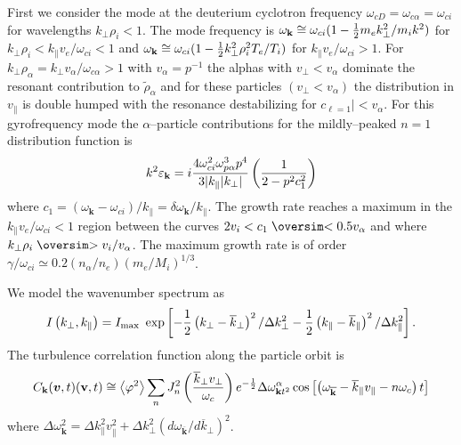 \documentclass[a4paper,openany,12pt]{report}
\def\nms{\mathsurround=0pt}
\def\gtsim{\mathrel{\mathpalette\oversim>}} %
\def\ltsim{\mathrel{\mathpalette\oversim<}} %
\def\oversim#1#2{\lower 2pt\vbox{\baselineskip 0pt \lineskip 1pt
    \ialign{$\nms#1\hfil##\hfil$\crcr#2\crcr\sim\crcr}}}
\begin{document}
First we consider the mode at the deuterium cyclotron frequency $\omega_{cD}=\omega_{c\alpha}=\omega_{ci}$ for wavelengths $k_\perp\rho_i < 1$. The mode frequency is $\omega_{\mathbf k}\cong\omega_{ci}(1-{1\over 2}m_e k^2_\perp/m_i k^2)$ for $k_\perp\rho_i<k_\| v_e/\omega_{ci}<1$ and $\omega_{\mathbf{k}}\cong\omega_{ci}(1-{1\over 2} k^2_\perp\rho_i^2 T_e/T_i)$ for $k_\| v_e/\omega_{ci}>1$. For $k_\perp\rho_\alpha=k_\perp v_\alpha/\omega_{c\alpha}>1$ with $v_\alpha=p^{-1}$ the alphas with $v_\perp<v_\alpha$ dominate the resonant contribution to $\widetilde\rho_\alpha$ and for these particles $(v_\perp< v_\alpha)$ the distribution in $v_\|$ is double humped with the resonance destabilizing for $c_{\ell=1}| < v_\alpha$. For this gyrofrequency mode the $\alpha$--particle contributions for the mildly--peaked $n=1$ distribution function is
\begin{equation}
k^2\varepsilon_{\mathbf{k}}=i{4\omega^2_{ci}\omega^3_{p\alpha}p^4\over 3|k_\||k_\perp|}\left({1\over 2-p^2 c^2_1}\right)\label{E7.3}
\end{equation}
where $c_1=(\omega_{\mathbf{k}}-\omega_{ci})/k_\|=\delta\omega_{\mathbf{k}}/k_\|$. 
The growth rate reaches a maximum in the $k_\| v_e/\omega_{ci}<1$ region between the curves $2v_i<c_1\ltsim 0.5 v_\alpha$ and where $k_\perp\rho_i\gtsim v_i/v_\alpha$. The maximum growth rate is of order $\gamma/\omega_{ci}\simeq 0.2(n_\alpha/n_e)(m_e/M_i)^{1/3}$.

We model the wavenumber spectrum as 
\begin{equation}
I\left(k_\perp, k_\|\right)=I_{\rm max}\ \exp\left[-{1\over 2}\left(k_\perp-\overline k_\perp\right)^2/\Delta k^2_\perp-{1\over 2}\left(k_\|-\overline k_\|\right)^2/\Delta k^2_\|\right].\label{E7.4}
\end{equation}
The turbulence correlation function along the particle orbit is
\begin{equation}
C_{\mathbf{k}}(\bm{v},t)(\mathbf{v},t)\cong\left<\varphi^2\right>\sum_n J^2_n\left({\overline k_\perp v_\perp\over\omega_c}\right) e^{-{1\over 2}}\Delta\omega^\alpha_{\mathbf{k} t^2}\cos\left[\left(\omega_{\overline{\mathbf{k}}}-\overline k_\| v_\|-n\omega_c\right) t\right]\label{E7.5}
\end{equation}
where $\Delta\omega^2_{\mathbf k}=\Delta k^2_\| v^2_\|+\Delta k^2_\perp\left(d\omega_{\overline{\mathbf k}}/
d\overline k_\perp\right)^2$.\\[3pt]
\end{document}
